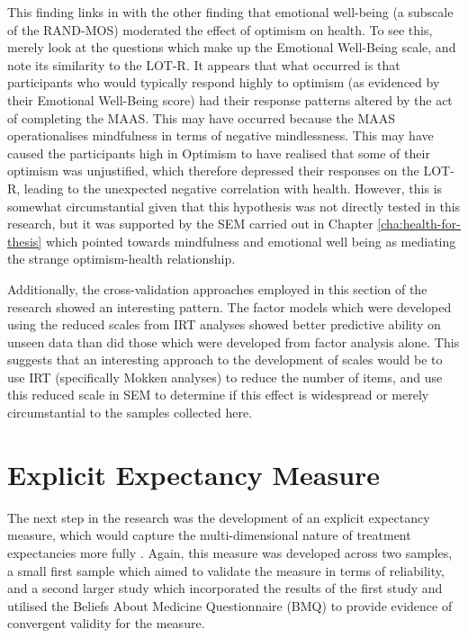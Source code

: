 This finding links in with the other finding that emotional well-being
(a subscale of the RAND-MOS) moderated the effect of optimism on
health. To see this, merely look at the questions which make up the
Emotional Well-Being scale, and note its similarity to the LOT-R. It
appears that what occurred is that participants who would typically
respond highly to optimism (as evidenced by their Emotional Well-Being
score) had their response patterns altered by the act of completing
the MAAS. This may have occurred because the MAAS operationalises
mindfulness in terms of negative mindlessness. This may have caused
the participants high in Optimism to have realised that some of their
optimism was unjustified, which therefore depressed their responses on
the LOT-R, leading to the unexpected negative correlation with health.
However, this is somewhat circumstantial given that this hypothesis
was not directly tested in this research, but it was supported by the
SEM carried out in Chapter \ref{cha:health-for-thesis} which pointed
towards mindfulness and emotional well being as mediating the strange
optimism-health relationship.

Additionally, the cross-validation approaches employed in this section
of the research showed an interesting pattern. The factor models which
were developed using the reduced scales from IRT analyses showed
better predictive ability on unseen data than did those which were
developed from factor analysis alone. This suggests that an
interesting approach to the development of scales would be to use IRT
(specifically Mokken analyses) to reduce the number of items, and use
this reduced scale in SEM to determine if this effect is widespread or
merely circumstantial to the samples collected here.

\section{Explicit Expectancy Measure}
\label{sec:expl-expect-meas}

The next step in the research was the development of an explicit
expectancy measure, which would capture the multi-dimensional nature
of treatment expectancies more fully \cite{Stone2005}. Again, this
measure was developed across two samples, a small first sample which
aimed to validate the measure in terms of reliability, and a second
larger study which incorporated the results of the first study and
utilised the Beliefs About Medicine Questionnaire (BMQ)
\cite{Horne1999} to provide evidence of convergent validity for the
measure.

